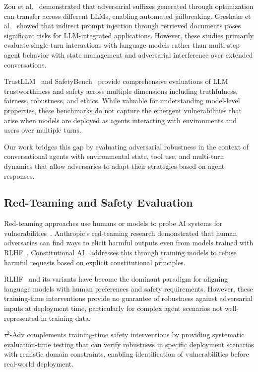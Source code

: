 \documentclass{article}
\newcommand{\tauadv}{$\tau^2$-Adv}
\begin{document}
Zou et al.~\cite{zou2023universal} demonstrated that adversarial suffixes generated through optimization can transfer across different LLMs, enabling automated jailbreaking. Greshake et al.~\cite{greshake2023compromising} showed that indirect prompt injection through retrieved documents poses significant risks for LLM-integrated applications. However, these studies primarily evaluate single-turn interactions with language models rather than multi-step agent behavior with state management and adversarial interference over extended conversations.

TrustLLM~\cite{sun2024trustllm} and SafetyBench~\cite{zhang2024safetybench} provide comprehensive evaluations of LLM trustworthiness and safety across multiple dimensions including truthfulness, fairness, robustness, and ethics. While valuable for understanding model-level properties, these benchmarks do not capture the emergent vulnerabilities that arise when models are deployed as agents interacting with environments and users over multiple turns.

Our work bridges this gap by evaluating adversarial robustness in the context of conversational agents with environmental state, tool use, and multi-turn dynamics that allow adversaries to adapt their strategies based on agent responses.

\subsection{Red-Teaming and Safety Evaluation}

Red-teaming approaches use humans or models to probe AI systems for vulnerabilities~\cite{ganguli2022red,perez2022red}. Anthropic's red-teaming research demonstrated that human adversaries can find ways to elicit harmful outputs even from models trained with RLHF~\cite{bai2022training}. Constitutional AI~\cite{bai2022constitutional} addresses this through training models to refuse harmful requests based on explicit constitutional principles.

RLHF~\cite{ouyang2022training,christiano2017deep} and its variants have become the dominant paradigm for aligning language models with human preferences and safety requirements. However, these training-time interventions provide no guarantee of robustness against adversarial inputs at deployment time, particularly for complex agent scenarios not well-represented in training data.

\tauadv{} complements training-time safety interventions by providing systematic evaluation-time testing that can verify robustness in specific deployment scenarios with realistic domain constraints, enabling identification of vulnerabilities before real-world deployment.
\end{document}
